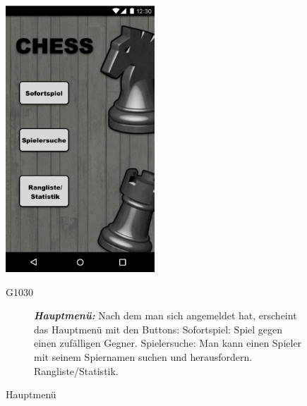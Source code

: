 \documentclass[parskip=full]{scrartcl}
\begin{document}
\begin{figure}[htp]
	\begin{minipage}[t]{6cm}
		\vspace{0pt}
		\includegraphics[height=100mm]{hauptmenu.png}
		\caption{Hauptmenü}
		\label{fig:Hauptmenü}
	\end{minipage}
	\hfill
	\begin{minipage}[t]{6cm}
		\vspace{0pt}
		\begin{description}
			\item[G1030] \textbf{\textit{Hauptmenü: }} Nach dem man sich angemeldet hat, erscheint das Hauptmenü mit den Buttons:
			Sofortspiel: Spiel gegen einen zufälligen Gegner.
			Spielersuche: Man kann einen Spieler mit seinem Spiernamen suchen und herausfordern.
			Rangliste/Statistik.
		\end{description}
	\end{minipage}


\end{figure}
\end{document}
